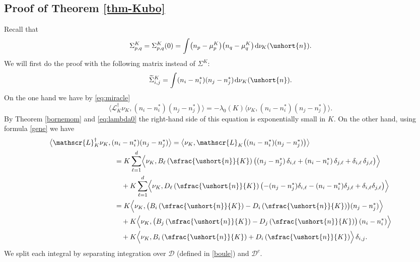 \documentclass[JEP,XML,SOM,Unicode]{cedram}
\newcommand{\scaleto}[2]{#1}
\let\mathcal\mathscr
\numberwithin{equation}{section}
\theoremstyle{plain}
\theoremstyle{definition}
\newcommand{\sK}{K}
\newcommand{\gen}{\mathscr{L}_{\sK}}
\newcommand{\vecn}{\ushort{n}}
\newcommand{\nuk}{\nu_{K}}\let\snuk\nuk
\newcommand{\dd}{\hspace{1pt}\mathrm{d}}
\begin{document}
\subsection{Proof of Theorem \ref{thm-Kubo}}\label{proof:kuboeq}

Recall that
\[
\Sigma^{\sK}_{p,q}=\Sigma^{\sK}_{p,q}(0)=\int \bigl(n_{p}-\mu_{p}^{\sK}\bigr) \bigl(n_{q}-\mu_{q}^{\sK}\bigr) \dd\nu\!_{\sK}(\vecn).
\]
We will first do the proof with the following matrix instead of $\Sigma^{\sK}$:
\[
\widetilde\Sigma^{\sK}_{i,j}=\int (n_{i}-n_{i}^{\scaleto{*}{2.5pt}})(n_{j}-n_{j}^{\scaleto{*}{2.5pt}}) \dd \nuk(\vecn).
\]
On the one hand we have by \eqref{eq:miracle}
\[
\big\langle \gen^{\dagger}\nuk,(n_{i}-n^{\scaleto{*}{2.5pt}}_{i})(n_{j}-n^{\scaleto{*}{2.5pt}}_{j})\big\rangle=-\lambda_{0}(K)
\big\langle\nuk,(n_{i}-n^{\scaleto{*}{2.5pt}}_{i})(n_{j}-n^{\scaleto{*}{2.5pt}}_{j})\big\rangle.
\]
By Theorem \ref{bornemom} and \eqref{eq:lambda0} the right-hand side of this equation is exponentially small in $K$.
On the other hand, using formula \eqref{gene} we have
\begin{align*}
\big\langle \gen^{\dagger}\nuk,(&n_{i}-n^{\scaleto{*}{2.5pt}}_{i})(n_{j}-n^{\scaleto{*}{2.5pt}}_{j})\big\rangle=
\big\langle \nuk,\gen\bigl((n_{i}-n^{\scaleto{*}{2.5pt}}_{i})(n_{j}-n^{\scaleto{*}{2.5pt}}_{j})\bigr)\big\rangle\\
& =K\sum_{\ell=1}^{d}\Bigl\langle\nuk,B_{\ell}\left(\sfrac{\vecn}{K}\right)\bigl((n_{j}-n^{\scaleto{*}{2.5pt}}_{j})\,\delta_{i,\ell}+
(n_{i}-n^{\scaleto{*}{2.5pt}}_{i})\,\delta_{j,\ell} +\delta_{i,\ell}\,\delta_{j,\ell}\bigr)\Bigr\rangle\\
& \quad +K\sum_{\ell=1}^{d}\Bigl\langle\nuk,D_{\ell}\left(\sfrac{\vecn}{K}\right)\bigl(-(n_{j}-n^{\scaleto{*}{2.5pt}}_{j})\delta_{i,\ell}-(n_{i}-n^{\scaleto{*}{2.5pt}}_{i})
\delta_{j,\ell}+\delta_{i,\ell}\delta_{j,\ell}\bigr)\Bigr\rangle\\
& =K\Bigl\langle\nuk,\bigl(B_{i}\left(\sfrac{\vecn}{K}\right)-D_{i}\left(\sfrac{\vecn}{K}\right)\bigr)(n_{j}-n^{\scaleto{*}{2.5pt}}_{j})\Bigr\rangle\\
& \quad +K\Bigl\langle\nuk,\bigl(B_{j}\left(\sfrac{\vecn}{K}\right)-D_{j}\left(\sfrac{\vecn}{K}\right)\bigr)\,(n_{i}-n^{\scaleto{*}{2.5pt}}_{i})
\Bigr\rangle\\
& \quad +K \Bigl\langle\nuk,B_{i}\left(\sfrac{\vecn}{K}\right)+D_{i}\left(\sfrac{\vecn}{K}\right)\Bigr\rangle\, \delta_{i,j}.
\end{align*}
We split each integral by separating integration over $\mathcal{D}$ (defined in \eqref{boule}) and $\mathcal{D}^c$.
\end{document}
